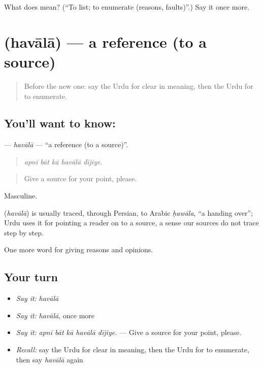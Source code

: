 \begin{tcolorbox}[breakable,colback=teal!4,colframe=teal!35!black,title={Before you move on}]
What does  mean? (\textquotedblleft{}To list; to enumerate (reasons, faults)\textquotedblright{}.) Say it once more.
\end{tcolorbox}
\section[\texorpdfstring{\ur{حوالہ} (havālā)}{حوالہ (havālā)}]{ (havālā) — a reference (to a source)}

\label{lesson:UR-C338-havala}



\begin{quote}
Before the new one: say the Urdu for clear in meaning, then the Urdu for to enumerate.
\end{quote}

\subsection*{You'll want to know: }
\textbf{} — \emph{havālā} — \textquotedblleft{}a reference (to a source)\textquotedblright{}.

\begin{quote}
    
\end{quote}

\begin{quote}
\emph{apnī bāt kā havālā dījiye.}
\end{quote}

\begin{quote}
Give a source for your point, please.
\end{quote}

Masculine.

\begin{cousinweb}
\textbf{} (\emph{havālā}) is usually traced, through Persian, to Arabic \emph{ḥawāla}, \textquotedblleft{}a handing over\textquotedblright{}; Urdu uses it for pointing a reader on to a source, a sense our sources do not trace step by step.
\end{cousinweb}

\begin{grammarlens}[title={What you've built}]
One more word for giving reasons and opinions.
\end{grammarlens}

\subsection*{Your turn}
\begin{itemize}
\raggedright
  \item \emph{Say it:} \emph{havālā}
  \item \emph{Say it:} \emph{havālā}, once more
  \item \emph{Say it:} \emph{apnī bāt kā havālā dījiye.} — Give a source for your point, please.
  \item \emph{Recall:} say the Urdu for clear in meaning, then the Urdu for to enumerate, then say \emph{havālā} again
\end{itemize}

